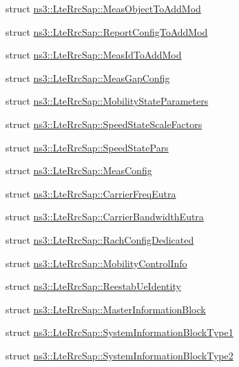 \begin{DoxyCompactItemize}
struct \hyperlink{structns3_1_1LteRrcSap_1_1MeasObjectToAddMod}{ns3\+::\+Lte\+Rrc\+Sap\+::\+Meas\+Object\+To\+Add\+Mod}
\item 
struct \hyperlink{structns3_1_1LteRrcSap_1_1ReportConfigToAddMod}{ns3\+::\+Lte\+Rrc\+Sap\+::\+Report\+Config\+To\+Add\+Mod}
\item 
struct \hyperlink{structns3_1_1LteRrcSap_1_1MeasIdToAddMod}{ns3\+::\+Lte\+Rrc\+Sap\+::\+Meas\+Id\+To\+Add\+Mod}
\item 
struct \hyperlink{structns3_1_1LteRrcSap_1_1MeasGapConfig}{ns3\+::\+Lte\+Rrc\+Sap\+::\+Meas\+Gap\+Config}
\item 
struct \hyperlink{structns3_1_1LteRrcSap_1_1MobilityStateParameters}{ns3\+::\+Lte\+Rrc\+Sap\+::\+Mobility\+State\+Parameters}
\item 
struct \hyperlink{structns3_1_1LteRrcSap_1_1SpeedStateScaleFactors}{ns3\+::\+Lte\+Rrc\+Sap\+::\+Speed\+State\+Scale\+Factors}
\item 
struct \hyperlink{structns3_1_1LteRrcSap_1_1SpeedStatePars}{ns3\+::\+Lte\+Rrc\+Sap\+::\+Speed\+State\+Pars}
\item 
struct \hyperlink{structns3_1_1LteRrcSap_1_1MeasConfig}{ns3\+::\+Lte\+Rrc\+Sap\+::\+Meas\+Config}
\item 
struct \hyperlink{structns3_1_1LteRrcSap_1_1CarrierFreqEutra}{ns3\+::\+Lte\+Rrc\+Sap\+::\+Carrier\+Freq\+Eutra}
\item 
struct \hyperlink{structns3_1_1LteRrcSap_1_1CarrierBandwidthEutra}{ns3\+::\+Lte\+Rrc\+Sap\+::\+Carrier\+Bandwidth\+Eutra}
\item 
struct \hyperlink{structns3_1_1LteRrcSap_1_1RachConfigDedicated}{ns3\+::\+Lte\+Rrc\+Sap\+::\+Rach\+Config\+Dedicated}
\item 
struct \hyperlink{structns3_1_1LteRrcSap_1_1MobilityControlInfo}{ns3\+::\+Lte\+Rrc\+Sap\+::\+Mobility\+Control\+Info}
\item 
struct \hyperlink{structns3_1_1LteRrcSap_1_1ReestabUeIdentity}{ns3\+::\+Lte\+Rrc\+Sap\+::\+Reestab\+Ue\+Identity}
\item 
struct \hyperlink{structns3_1_1LteRrcSap_1_1MasterInformationBlock}{ns3\+::\+Lte\+Rrc\+Sap\+::\+Master\+Information\+Block}
\item 
struct \hyperlink{structns3_1_1LteRrcSap_1_1SystemInformationBlockType1}{ns3\+::\+Lte\+Rrc\+Sap\+::\+System\+Information\+Block\+Type1}
\item 
struct \hyperlink{structns3_1_1LteRrcSap_1_1SystemInformationBlockType2}{ns3\+::\+Lte\+Rrc\+Sap\+::\+System\+Information\+Block\+Type2}

\end{DoxyCompactItemize}
